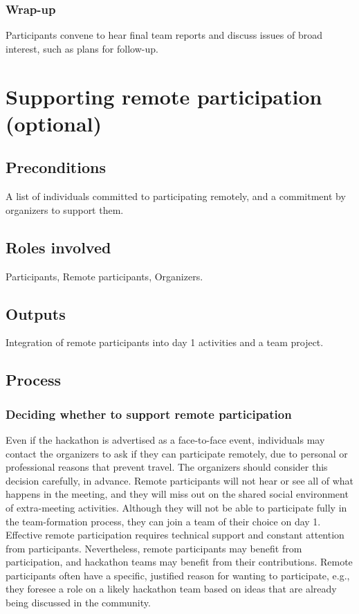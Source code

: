 \documentclass[letterpaper,11pt]{texMemo}
\begin{document}
\subsubsection*{Wrap-up} Participants convene to hear final team reports and discuss issues of broad interest, such as plans for follow-up.  

\newpage
\section{Supporting remote participation (optional)}
\subsection{Preconditions}
A list of individuals committed to participating remotely, and a commitment by organizers to support them. 
\subsection{Roles involved}
Participants, Remote participants, Organizers. 
\subsection{Outputs}
Integration of remote participants into day 1 activities and a team project.  
\subsection{Process}
\subsubsection*{Deciding whether to support remote participation} Even if the hackathon is advertised as a face-to-face event, individuals may contact the organizers to ask if they can participate remotely, due to personal or professional reasons that prevent travel.  The organizers should consider this decision carefully, in advance. Remote participants will not hear or see all of what happens in the meeting, and they will miss out on the shared social environment of extra-meeting activities. Although they will not be able to participate fully in the team-formation process, they can join a team of their choice on day 1. Effective remote participation requires technical support and constant attention from participants. Nevertheless, remote participants may benefit from participation, and hackathon teams may benefit from their contributions. Remote participants often have a specific, justified reason for wanting to participate, e.g., they foresee a role on a likely hackathon team based on ideas that are already being discussed in the community.  
\end{document}

